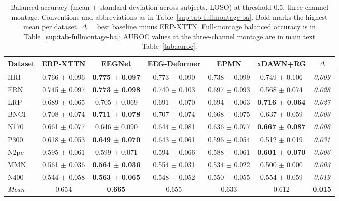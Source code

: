 \begin{table}[t]
\centering
\setlength{\tabcolsep}{5pt}
\caption{%
Balanced accuracy (mean $\pm$ standard deviation across subjects, LOSO) at threshold 0.5, three-channel montage. Conventions and abbreviations as in Table~\ref{sup:tab-fullmontage-ba}. Bold marks the highest mean per dataset. $\Delta$ = best baseline minus ERP-XTTN. Full-montage balanced accuracy is in Table~\ref{sup:tab-fullmontage-ba}; AUROC values at the three-channel montage are in main text Table~\ref{tab:auroc}.%
}
\label{sup:tab-balacc}
\begin{tabular}{lcccccc}
\toprule
Dataset & ERP-XTTN & EEGNet & EEG-Deformer & EPMN & xDAWN+RG & $\Delta$ \\
\midrule
HRI & 0.766 $\pm$ 0.096 & \textbf{0.775 $\pm$ 0.097} & 0.773 $\pm$ 0.090 & 0.738 $\pm$ 0.099 & 0.749 $\pm$ 0.106 & \textit{0.009} \\
ERN & 0.745 $\pm$ 0.097 & \textbf{0.773 $\pm$ 0.098} & 0.740 $\pm$ 0.103 & 0.697 $\pm$ 0.093 & 0.568 $\pm$ 0.074 & \textit{0.028} \\
LRP & 0.689 $\pm$ 0.065 & 0.705 $\pm$ 0.069 & 0.691 $\pm$ 0.070 & 0.694 $\pm$ 0.063 & \textbf{0.716 $\pm$ 0.064} & \textit{0.027} \\
BNCI & 0.708 $\pm$ 0.074 & \textbf{0.711 $\pm$ 0.078} & 0.707 $\pm$ 0.074 & 0.668 $\pm$ 0.075 & 0.637 $\pm$ 0.059 & \textit{0.003} \\
N170 & 0.661 $\pm$ 0.077 & 0.646 $\pm$ 0.090 & 0.644 $\pm$ 0.081 & 0.636 $\pm$ 0.077 & \textbf{0.667 $\pm$ 0.087} & \textit{0.006} \\
P300 & 0.618 $\pm$ 0.053 & \textbf{0.649 $\pm$ 0.070} & 0.643 $\pm$ 0.061 & 0.596 $\pm$ 0.054 & 0.512 $\pm$ 0.019 & \textit{0.031} \\
N2pc & 0.595 $\pm$ 0.061 & 0.599 $\pm$ 0.071 & 0.594 $\pm$ 0.066 & 0.588 $\pm$ 0.061 & \textbf{0.601 $\pm$ 0.070} & \textit{0.006} \\
MMN & 0.561 $\pm$ 0.036 & \textbf{0.564 $\pm$ 0.036} & 0.554 $\pm$ 0.031 & 0.534 $\pm$ 0.022 & 0.500 $\pm$ 0.000 & \textit{0.003} \\
N400 & 0.544 $\pm$ 0.058 & \textbf{0.563 $\pm$ 0.065} & 0.548 $\pm$ 0.052 & 0.550 $\pm$ 0.055 & 0.554 $\pm$ 0.059 & \textit{0.019} \\
\midrule
\textit{Mean} & 0.654 & \textbf{0.665} & 0.655 & 0.633 & 0.612 & \textbf{0.015} \\
\bottomrule
\end{tabular}
\end{table}
